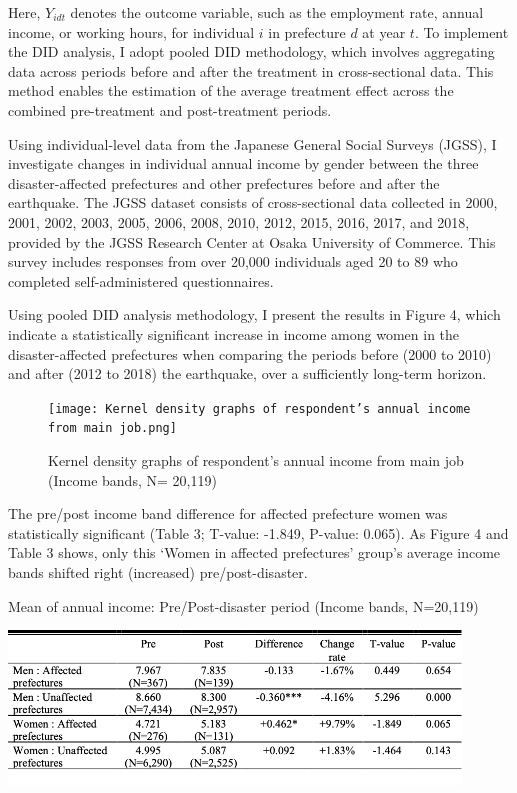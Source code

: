\documentclass[12pt,halfline,a4paper]{ouparticle}
\begin{document}
Here, \( Y_{idt} \) denotes the outcome variable, such as the employment rate, annual income, or working hours, for individual \( i \) in prefecture \( d \) at year \( t \). To implement the DID analysis, I adopt pooled DID methodology, which involves aggregating data across periods before and after the treatment in cross-sectional data. This method enables the estimation of the average treatment effect across the combined pre-treatment and post-treatment periods.

Using individual-level data from the Japanese General Social Surveys (JGSS), I investigate changes in individual annual income by gender between the three disaster-affected prefectures and other prefectures before and after the earthquake. The JGSS dataset consists of cross-sectional data collected in 2000, 2001, 2002, 2003, 2005, 2006, 2008, 2010, 2012, 2015, 2016, 2017, and 2018, provided by the JGSS Research Center at Osaka University of Commerce. This survey includes responses from over 20,000 individuals aged 20 to 89 who completed self-administered questionnaires. 

Using pooled DID analysis methodology, I present the results in Figure 4, which indicate a statistically significant increase in income among women in the disaster-affected prefectures when comparing the periods before (2000 to 2010) and after (2012 to 2018) the earthquake, over a sufficiently long-term horizon.


\begin{figure}[h!]
    \centering
    \texttt{[image: Kernel density graphs of respondent’s annual income from main job.png]}  %
    \caption{Kernel density graphs of respondent’s annual income from main job (Income bands, N= 20,119)}
    \label{fig:conceptual_model}
\end{figure}

The pre/post income band difference for affected prefecture women was statistically significant (Table 3; T-value: -1.849, P-value: 0.065). As Figure 4 and Table 3 shows, only this ‘Women in affected prefectures’ group's average income bands shifted right (increased) pre/post-disaster.


\begin{table}[h!]
    \centering
    \caption{Mean of annual income: Pre/Post-disaster period (Income bands, N=20,119)}
    \label{tab:annual_income}
    \includegraphics[width=0.9\textwidth]{Annual income table.png}  %
\end{table}
\end{document}
